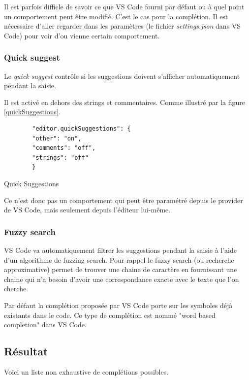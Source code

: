 \documentclass[
    iict, %
    il, %
]{heig-tb}
\begin{document}
Il est parfois difficle de savoir ce que VS Code fourni par défaut ou à quel point un comportement peut être modifié.
C'est le cas pour la complétion. Il est nécessaire d'aller regarder dans les paramètres (le fichier \emph{settings.json} dans VS Code) pour voir d'ou vienne certain comportement.

\subsubsection{Quick suggest}

Le \emph{quick suggest} contrôle si les suggestions doivent s'afficher automatiquement pendant la saisie.

Il est activé en dehors des strings et commentaires. Comme illustré par la figure \ref{quickSuggestions}.

\begin{listing}[!ht]
    \begin{verbatim}
        "editor.quickSuggestions": {
        "other": "on",
        "comments": "off",
        "strings": "off"
        }
    \end{verbatim}
    \caption{Quick Suggestions}
    \label{quickSuggestions}
\end{listing}

Ce n'est donc pas un comportement qui peut être paramétré depuis le provider de VS Code, mais seulement depuis l'éditeur lui-même. \cite{quick-suggestion}

\subsubsection{Fuzzy search}

VS Code va automatiquement filtrer les suggestions pendant la saisie à l'aide d'un algorithme de fuzzing search.
Pour rappel le fuzzy search (ou recherche approximative) permet de trouver une chaine de caractère en fournissant une chaine qui n'a besoin d'avoir une correspondance exacte
avec le texte que l'on cherche.

Par défaut la complétion proposée par VS Code porte sur les symboles déjà existants dans le code.
Ce type de complétion est nommé "word based completion" dans VS Code.

\subsection{Résultat}

Voici un liste non exhaustive de complétions possibles.
\end{document}
